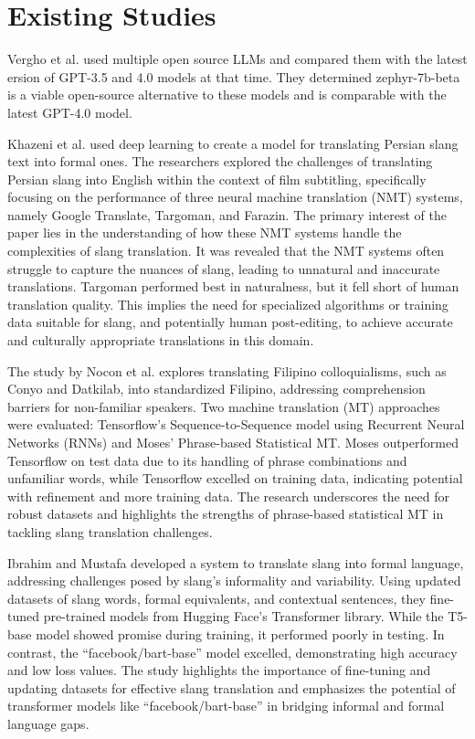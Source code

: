 \section{Existing Studies}
Vergho et al. \cite{Vergho} used multiple open source LLMs and compared them with the latest ersion of GPT-3.5 and 4.0 models at that time.
They determined zephyr-7b-beta is a viable open-source alternative to these models and is comparable with the latest GPT-4.0 model.

Khazeni et al. \cite{Khazeni} used deep learning to create a model for translating Persian slang text into formal ones. The researchers explored the challenges of translating Persian slang into English within the context of film subtitling, specifically focusing on the performance of three neural machine translation (NMT) systems, namely Google Translate, Targoman, and Farazin. The primary interest of the paper lies in the understanding of how these NMT systems handle the complexities of slang translation. It was revealed that the NMT systems often struggle to capture the nuances of slang, leading to unnatural and inaccurate translations. Targoman performed best in naturalness, but it fell short of human translation quality. This implies the need for specialized algorithms or training data suitable for slang, and potentially human post-editing, to achieve accurate and culturally appropriate translations in this domain.
 
The study by Nocon et al. \cite{Nocon_Kho_Arroyo_2018} explores translating Filipino colloquialisms, such as Conyo and Datkilab, into standardized Filipino, addressing comprehension barriers for non-familiar speakers. Two machine translation (MT) approaches were evaluated: Tensorflow's Sequence-to-Sequence model using Recurrent Neural Networks (RNNs) and Moses' Phrase-based Statistical MT. Moses outperformed Tensorflow on test data due to its handling of phrase combinations and unfamiliar words, while Tensorflow excelled on training data, indicating potential with refinement and more training data. The research underscores the need for robust datasets and highlights the strengths of phrase-based statistical MT in tackling slang translation challenges.

Ibrahim and Mustafa \cite{Ibrahim_Sharief} developed a system to translate slang into formal language, addressing challenges posed by slang's informality and variability. Using updated datasets of slang words, formal equivalents, and contextual sentences, they fine-tuned pre-trained models from Hugging Face's Transformer library. While the T5-base model showed promise during training, it performed poorly in testing. In contrast, the “facebook/bart-base” model excelled, demonstrating high accuracy and low loss values. The study highlights the importance of fine-tuning and updating datasets for effective slang translation and emphasizes the potential of transformer models like “facebook/bart-base” in bridging informal and formal language gaps. 

